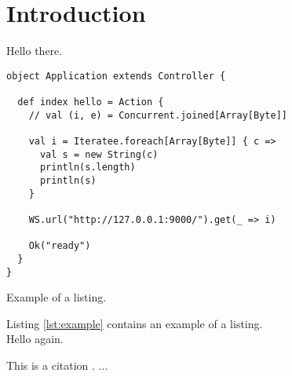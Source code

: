 \chapter{Introduction}
Hello there.
 
\begin{listing}[H]
\begin{verbatim}
object Application extends Controller {

  def index hello = Action {
    // val (i, e) = Concurrent.joined[Array[Byte]]

    val i = Iteratee.foreach[Array[Byte]] { c =>
      val s = new String(c)
      println(s.length)
      println(s)
    }

    WS.url("http://127.0.0.1:9000/").get(_ => i)

    Ok("ready")
  }
}
\end{verbatim}
\caption{Example of a listing.}
\label{lst:example}
\end{listing}

Listing \ref{lst:example} contains an example of a listing.
\\

Hello again.

This is a citation \cite{online1}.
...